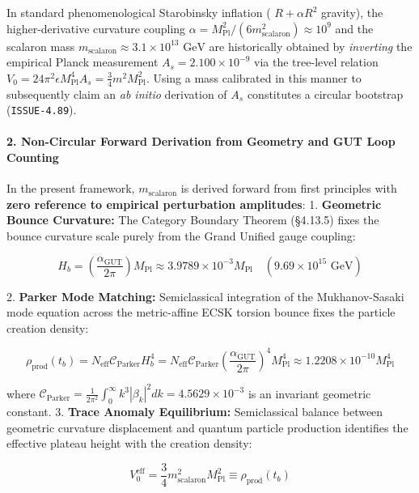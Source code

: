 \documentclass[11pt,a4paper]{article}
\theoremstyle{definition}\newtheorem{definition}{Definition}
\theoremstyle{remark}\newtheorem{remark}{Remark}
\begin{document}
In standard phenomenological Starobinsky inflation ( $R + \alpha R^2$ gravity), the higher-derivative curvature coupling $\alpha = M_{\text{Pl}}^2 / (6 m_{\text{scalaron}}^2) \approx 10^9$ and the scalaron mass $m_{\text{scalaron}} \approx 3.1 \times 10^{13}\text{ GeV}$ are historically obtained by \textit{inverting} the empirical Planck measurement $A_s = 2.100 \times 10^{-9}$ via the tree-level relation $V_0 = 24 \pi^2 \epsilon M_{\text{Pl}}^4 A_s = \frac{3}{4} m^2 M_{\text{Pl}}^2$. Using a mass calibrated in this manner to subsequently claim an \textit{ab initio} derivation of $A_s$ constitutes a circular bootstrap (\texttt{ISSUE-4.89}).
\paragraph{2. Non-Circular Forward Derivation from Geometry and GUT Loop Counting}

In the present framework, $m_{\text{scalaron}}$ is derived forward from first principles with \textbf{zero reference to empirical perturbation amplitudes}:
1. \textbf{Geometric Bounce Curvature:} The Category Boundary Theorem (§4.13.5) fixes the bounce curvature scale purely from the Grand Unified gauge coupling:


\begin{equation}
H_b = \left(\frac{\alpha_{\text{GUT}}}{2\pi}\right) M_{\text{Pl}} \approx 3.9789 \times 10^{-3} M_{\text{Pl}} \quad (9.69 \times 10^{15}\text{ GeV})
\end{equation}


2. \textbf{Parker Mode Matching:} Semiclassical integration of the Mukhanov-Sasaki mode equation across the metric-affine ECSK torsion bounce fixes the particle creation density:


\begin{equation}
\rho_{\text{prod}}(t_b) = N_{\text{eff}} \mathcal{C}_{\text{Parker}} H_b^4 = N_{\text{eff}} \mathcal{C}_{\text{Parker}} \left(\frac{\alpha_{\text{GUT}}}{2\pi}\right)^4 M_{\text{Pl}}^4 \approx 1.2208 \times 10^{-10} M_{\text{Pl}}^4
\end{equation}


where $\mathcal{C}_{\text{Parker}} = \frac{1}{2\pi^2} \int_0^\infty k^3 |\beta_k|^2 dk = 4.5629 \times 10^{-3}$ is an invariant geometric constant.
3. \textbf{Trace Anomaly Equilibrium:} Semiclassical balance between geometric curvature displacement and quantum particle production identifies the effective plateau height with the creation density:


\begin{equation}
V_0^{\text{eff}} = \frac{3}{4} m_{\text{scalaron}}^2 M_{\text{Pl}}^2 \equiv \rho_{\text{prod}}(t_b)
\end{equation}
\end{document}

